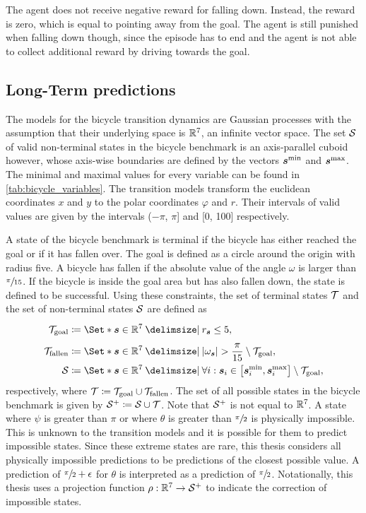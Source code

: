 The agent does not receive negative reward for falling down.
Instead, the reward is zero, which is equal to pointing away from the goal.
The agent is still punished when falling down though, since the episode has to end and the agent is not able to collect additional reward by driving towards the goal.

\subsection{Long-Term predictions}
\label{sub:map_predictions}
The models for the bicycle transition dynamics are Gaussian processes with the assumption that their underlying space is $\mathbb{R}^7$, an infinite vector space.
The set $\mathcal{S}$ of valid non-terminal states in the bicycle benchmark is an axis-parallel cuboid however, whose axis-wise boundaries are defined by the vectors $\bm{s}^{\text{min}}$ and $\bm{s}^{\text{max}}$.
The minimal and maximal values for every variable can be found in \cref{tab:bicycle_variables}.
The transition models transform the euclidean coordinates $x$ and $y$ to the polar coordinates $\varphi$ and $r$.
Their intervals of valid values are given by the intervals ($-\pi$, $\pi$] and [0, 100] respectively.

A state of the bicycle benchmark is terminal if the bicycle has either reached the goal or if it has fallen over.
The goal is defined as a circle around the origin with radius five.
A bicycle has fallen if the absolute value of the angle $\omega$ is larger than $\sfrac{\pi}{15}$.
If the bicycle is inside the goal area but has also fallen down, the state is defined to be successful.
Using these constraints, the set of terminal states $\mathcal{T}$ and the set of non-terminal states $\mathcal{S}$ are defined as
\begin{align}
    \Goal &\coloneqq \Set*{\mat{s} \in \R^7 \with r_{\mat{s}} \leq 5 \vphantom{\frac{\pi}{15}}}, \\
    \Fallen &\coloneqq \Set*{\mat{s} \in \R^7 \with \abs{\omega_{\mat{s}}} > \frac{\pi}{15}} \setminus \Goal, \\
    \Es &\coloneqq \Set*{\mat{s} \in \R^7 \with \forall i : \mat{s}_i \in \left[ \mat{s}_i^{\text{min}}, \mat{s}_i^{\text{max}} \right]} \setminus \Goal,
\end{align}
respectively, where $\mathcal{T} \coloneqq \mathcal{T}_{\text{goal}} \cup \mathcal{T}_{\text{fallen}}$.
The set of all possible states in the bicycle benchmark is given by $\mathcal{S}^+ \coloneqq \mathcal{S} \cup \mathcal{T}$.
Note that $\mathcal{S}^+$ is not equal to $\mathbb{R}^7$.
A state where $\psi$ is greater than $\pi$ or where $\theta$ is greater than $\sfrac{\pi}{2}$ is physically impossible.
This is unknown to the transition models and it is possible for them to predict impossible states.
Since these extreme states are rare, this thesis considers all physically impossible predictions to be predictions of the closest possible value.
A prediction of $\sfrac{\pi}{2} + \epsilon$ for $\theta$ is interpreted as a prediction of $\sfrac{\pi}{2}$.
Notationally, this thesis uses a projection function $\squeeze : \R^7 \to \Es^+$ to indicate the correction of impossible states.

